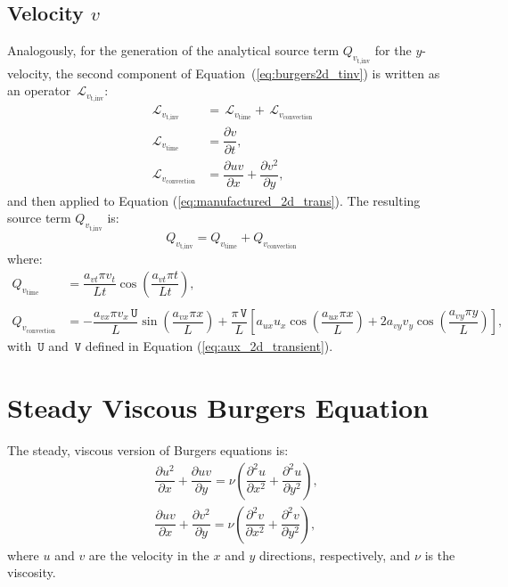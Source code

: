 \documentclass[10pt]{article}
\newcommand{\diff}[2] {\dfrac{\partial #1}{\partial #2}}
\newcommand{\Lo}{\,\mathcal{L}}
\newcommand{\U}{\,\mathtt{U}}
\newcommand{\V}{\,\mathtt{V}}
\begin{document}
\subsection{Velocity $v$}
Analogously, for the generation of the analytical source term $Q_{v_\text{t,inv}}$ for the $y$-velocity, the second component of  Equation~(\ref{eq:burgers2d_tinv}) is written as an  operator $\Lo_{v_\text{t,inv}}$:
\begin{equation*}
\begin{split}
\Lo_{v_\text{t,inv}}&= \Lo_{v_\text{time}}+\Lo_{v_\text{convection}}\\
\Lo_{v_\text{time}}&=\diff{ v}{t},\\
\Lo_{v_\text{convection}}&=\diff{ u v}{x} + \diff{  v^2 }{y},
\end{split}
\end{equation*}
and then applied to Equation  (\ref{eq:manufactured_2d_trans}).  The resulting source term $Q_{v_\text{t,inv}}$ is:
$$Q_{v_\text{t,inv}}= Q_{v_\text{time}}+Q_{v_\text{convection}}$$
where:
\begin{equation}
\begin{split}
Q_{v_\text{time}} &=\dfrac{ a_{vt} \pi v_t }{Lt}\cos\left(\dfrac{a_{vt} \pi t}{Lt}\right), \\  
%
&\\
%
 Q_{v_\text{convection}} &= -\dfrac{a_{vx} \pi v_x \U}{L} \sin\left(\dfrac{a_{vx} \pi x}{L}\right)+\dfrac{ \pi \V}{L}\left[a_{ux} u_x \cos\left(\dfrac{a_{ux} \pi x}{L}\right)+2 a_{vy} v_y \cos\left(\dfrac{a_{vy} \pi y}{L}\right)\right] , 
%
\end{split}
\end{equation}
with $\U$ and $\V$ defined in Equation (\ref{eq:aux_2d_transient}).



\section{Steady Viscous Burgers Equation}


The steady, viscous version of Burgers equations is:
\begin{equation}
 \label{eq:burgers2d_sv}
\begin{split}
& \diff{ u^2 }{x}+\diff{uv}{y}=\nu \left( \diff{^2u}{ x^2}+ \diff{^2u }{y^2}\right),\\
& \diff{ u v}{x} + \diff{  v^2 }{y}=\nu \left( \diff{^2v}{ x^2}+ \diff{^2v }{y^2}\right),
\end{split}
\end{equation}
%
where $u$ and $v$ are the velocity in the  $x$ and $y$  directions, respectively, and $\nu$ is the viscosity.
\end{document}
